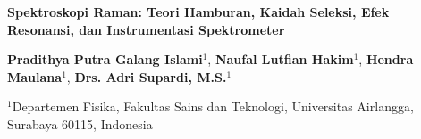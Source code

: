 \documentclass[10pt,a4paper]{article}
\begin{document}
\begin{center}
    {\fontsize{12pt}{15pt}\selectfont \textbf{Spektroskopi Raman: Teori Hamburan, Kaidah Seleksi, Efek\\Resonansi, dan Instrumentasi Spektrometer}\par}
    \vspace{0.2cm}
    {\normalsize\textbf{Pradithya Putra Galang Islami}$^1$, \textbf{Naufal Lutfian Hakim}$^1$, \textbf{Hendra Maulana}$^1$, \textbf{Drs. Adri Supardi, M.S.}$^1$\par}
    \vspace{0.1cm}
    {\footnotesize $^1$Departemen Fisika, Fakultas Sains dan Teknologi, Universitas Airlangga, Surabaya 60115, Indonesia\par}
\end{center}
\vspace{0.15cm}
\end{document}
